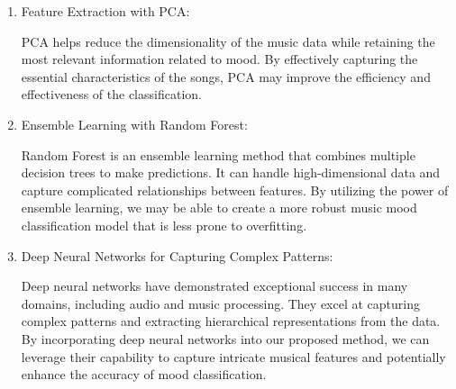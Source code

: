 \documentclass{article}
\begin{document}
\begin{enumerate}
  \item Feature Extraction with PCA: 
  
  PCA helps reduce the dimensionality of the music data while retaining the most relevant information related to mood. By effectively capturing the essential characteristics of the songs, PCA may improve the efficiency and effectiveness of the classification.
  \item Ensemble Learning with Random Forest: 
  
  Random Forest is an ensemble learning method that combines multiple decision trees to make predictions. It can handle high-dimensional data and capture complicated relationships between features. By utilizing the power of ensemble learning, we may be able to create a more robust music mood classification model that is less prone to overfitting.
  
  \item Deep Neural Networks for Capturing Complex Patterns: 
  
  Deep neural networks have demonstrated exceptional success in many domains, including audio and music processing. They excel at capturing complex patterns and extracting hierarchical representations from the data. By incorporating deep neural networks into our proposed method, we can leverage their capability to capture intricate musical features and potentially enhance the accuracy of mood classification.
\end{enumerate}
\end{document}

